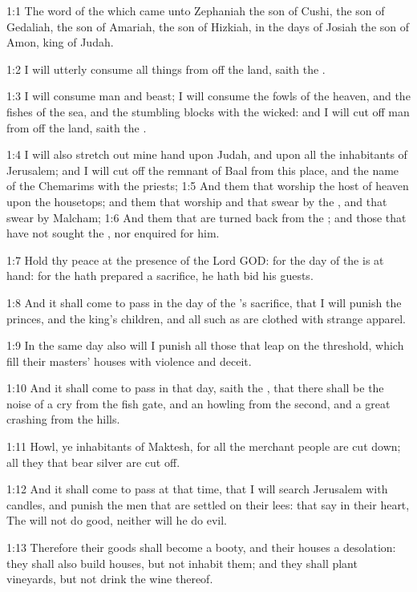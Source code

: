 

1:1 The word of the \LORD which came unto Zephaniah the son of Cushi,
the son of Gedaliah, the son of Amariah, the son of Hizkiah, in the
days of Josiah the son of Amon, king of Judah.

1:2 I will utterly consume all things from off the land, saith the
\LORD.

1:3 I will consume man and beast; I will consume the fowls of the
heaven, and the fishes of the sea, and the stumbling blocks with the
wicked: and I will cut off man from off the land, saith the \LORD.

1:4 I will also stretch out mine hand upon Judah, and upon all the
inhabitants of Jerusalem; and I will cut off the remnant of Baal from
this place, and the name of the Chemarims with the priests; 1:5 And
them that worship the host of heaven upon the housetops; and them that
worship and that swear by the \LORD, and that swear by Malcham; 1:6 And
them that are turned back from the \LORD; and those that have not
sought the \LORD, nor enquired for him.

1:7 Hold thy peace at the presence of the Lord GOD: for the day of the
\LORD is at hand: for the \LORD hath prepared a sacrifice, he hath bid
his guests.

1:8 And it shall come to pass in the day of the \LORD's sacrifice, that
I will punish the princes, and the king's children, and all such as
are clothed with strange apparel.

1:9 In the same day also will I punish all those that leap on the
threshold, which fill their masters' houses with violence and deceit.

1:10 And it shall come to pass in that day, saith the \LORD, that there
shall be the noise of a cry from the fish gate, and an howling from
the second, and a great crashing from the hills.

1:11 Howl, ye inhabitants of Maktesh, for all the merchant people are
cut down; all they that bear silver are cut off.

1:12 And it shall come to pass at that time, that I will search
Jerusalem with candles, and punish the men that are settled on their
lees: that say in their heart, The \LORD will not do good, neither will
he do evil.

1:13 Therefore their goods shall become a booty, and their houses a
desolation: they shall also build houses, but not inhabit them; and
they shall plant vineyards, but not drink the wine thereof.

